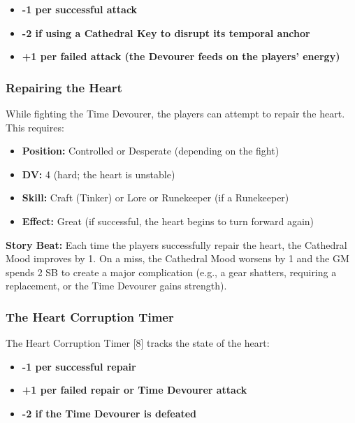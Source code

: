 \documentclass{article}
\begin{document}
\begin{itemize}
    \item \textbf{-1 per successful attack}
    \item \textbf{-2 if using a Cathedral Key to disrupt its temporal anchor}
    \item \textbf{+1 per failed attack (the Devourer feeds on the players' energy)}
\end{itemize}

\subsubsection{Repairing the Heart}

While fighting the Time Devourer, the players can attempt to repair the heart. This requires:

\begin{itemize}
    \item \textbf{Position:} Controlled or Desperate (depending on the fight)
    \item \textbf{DV:} 4 (hard; the heart is unstable)
    \item \textbf{Skill:} Craft (Tinker) or Lore or Runekeeper (if a Runekeeper)
    \item \textbf{Effect:} Great (if successful, the heart begins to turn forward again)
\end{itemize}

\begin{storybox}
\textbf{Story Beat:} Each time the players successfully repair the heart, the Cathedral Mood improves by 1. On a miss, the Cathedral Mood worsens by 1 and the GM spends 2 SB to create a major complication (e.g., a gear shatters, requiring a replacement, or the Time Devourer gains strength).
\end{storybox}

\subsubsection{The Heart Corruption Timer }

The Heart Corruption Timer [8] tracks the state of the heart:

\begin{itemize}
    \item \textbf{-1 per successful repair}
    \item \textbf{+1 per failed repair or Time Devourer attack}
    \item \textbf{-2 if the Time Devourer is defeated}
\end{itemize}
\end{document}
